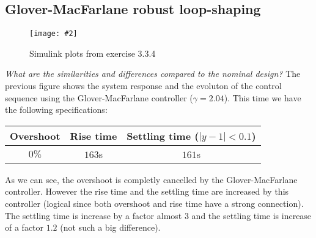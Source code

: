 \documentclass[a4paper,11pt]{article}
\newcommand{\image}[3][width=.8\columnwidth]{
	\begin{figure}[h!]
		\centering
	    \texttt{[image: \#2]}
		\caption{#3}
		\label{fig:#2}
	\end{figure}
}
\begin{document}
	\subsection*{Glover-MacFarlane robust loop-shaping}

	\image{fig/figure_6.eps}{Simulink plots from exercise 3.3.4}

    \emph{What are the similarities and differences compared to the nominal design?}
    The previous figure shows the system response and the evoluton of the control sequence using the Glover-MacFarlane controller ($\gamma = 2.04$).
    This time we have the following specifications:
    \begin{center}
    \begin{tabular}{|c|c|c|}
        \hline
        Overshoot & Rise time & Settling time ($|y - 1| < 0.1$)\\
        \hline
        $0\%$ & $163$s & $161$s \\
        \hline
    \end{tabular}
    \end{center}
    As we can see, the overshoot is completly cancelled by the Glover-MacFarlane controller. However the rise time and the settling time are increased by this controller (logical since both overshoot and rise time have a strong connection). The settling time is increase by a factor almost $3$ and the settling time is increase of a factor $1.2$ (not such a big difference).
\end{document}
